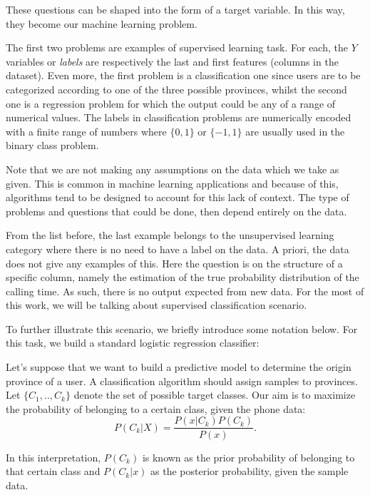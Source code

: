 These questions can be shaped into the form of a target variable. In this way, they become our machine learning problem.

The first two problems are examples of supervised learning task. For each, the $Y$ variables or \textit{labels} are respectively the last and first features (columns in the dataset). Even more, the first problem is a classification one since users are to be categorized according to one of the three possible provinces, whilst the second one is a regression problem for which the output could be any of a range of numerical values. The labels in classification problems are numerically encoded with a finite range of numbers where $\{0,1\}$ or $\{-1,1\}$ are usually used in the binary class problem.

Note that we are not making any assumptions on the data which we take as given. %
This is common in machine learning applications and because of this, algorithms tend to be designed to account for this lack of context. The type of problems and questions that could be done, then depend entirely on the data.

From the list before, the last example belongs to the unsupervised learning category where there is no need to have a label on the data. A priori, the data does not give any examples of this. Here the question is on the structure of a specific column, namely the estimation of the true probability distribution of the calling time. As such, there is no output expected from new data. For the most of this work, we will be talking about supervised classification scenario.

To further illustrate this scenario, we briefly introduce some notation below. For this task, we build a standard logistic regression classifier:

Let's suppose that we want to build a predictive model to determine the origin province of a user. A classification algorithm should assign samples to provinces. Let $\{C_1,..,C_k\}$ denote the set of possible target classes. Our aim is to maximize the probability of belonging to a certain class, given the phone data:
\begin{equation}
P(C_k| X) = \frac{P(x|C_k)P(C_k)}{P(x)} .
\end{equation}

In this interpretation, $P(C_k)$ is known as the prior probability of belonging to that certain class and $P(C_k|x)$ as the posterior probability, given the sample data.

